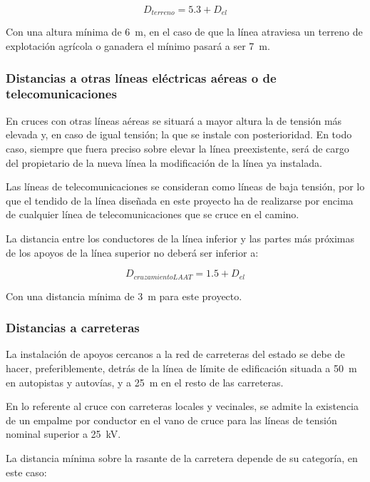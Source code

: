 \begin{equation}
    D_{terreno} = 5.3+D_{el}
    \label{eq:dist-otras-terreno}
\end{equation}

Con una altura mínima de \SI{6}{\meter}, en el caso de que la línea atraviesa un terreno de explotación agrícola o ganadera el mínimo pasará a ser \SI{7}{\meter}. 

\subsubsection{Distancias a otras líneas eléctricas aéreas o de telecomunicaciones}
\label{subsubsec:otras-lineas}
En cruces con otras líneas aéreas se situará a mayor altura la de tensión más elevada y, en caso de igual tensión; la que se instale con posterioridad. En todo caso, siempre que fuera preciso sobre elevar la línea preexistente, será de cargo del propietario de la nueva línea la modificación de la línea ya instalada. 

Las líneas de telecomunicaciones se consideran como líneas de baja tensión, por lo que el tendido de la línea diseñada en este proyecto ha de realizarse por encima de cualquier línea de telecomunicaciones que se cruce en el camino. 

La distancia entre los conductores de la línea inferior y las partes más próximas de los apoyos de la línea superior no deberá ser inferior a: 

\begin{equation}
    D_{cruzamientoLAAT} = 1.5 + D_{el}
    \label{eq:dist-otras-cruzLAAT}
\end{equation}

Con una distancia mínima de \SI{3}{\meter} para este proyecto. 
\subsubsection{Distancias a carreteras}
\label{subsubsec:otras-carreteras}
La instalación de apoyos cercanos a la red de carreteras del estado se debe de hacer, preferiblemente, detrás de la línea de límite de edificación situada a \SI{50}{\meter} en autopistas y autovías, y a \SI{25}{\meter} en el resto de las carreteras. 

En lo referente al cruce con carreteras locales y vecinales, se admite la existencia de un empalme por conductor en el vano de cruce para las líneas de tensión nominal superior a \SI{25}{\kilo\volt}. 

La distancia mínima sobre la rasante de la carretera depende de su categoría, en este caso: 

